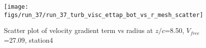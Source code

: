\begin{figure}[H]
\centering
\texttt{[image: figs/run\_37/run\_37\_turb\_visc\_ettap\_bot\_vs\_r\_mesh\_scatter]}
\caption{Scatter plot of velocity gradient term vs radius at $z/c$=8.50, $V_{free}$=27.09, station4}
\label{fig:run_37_turb_visc_ettap_bot_vs_r_mesh_scatter}
\end{figure}


